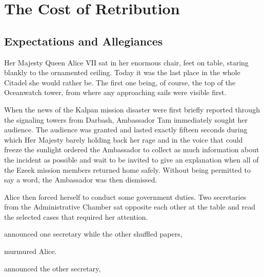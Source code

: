 \chapter{The Cost of Retribution}

\section{Expectations and Allegiances}

Her Majesty Queen Alice VII sat in her enormous chair, feet on table, staring blankly to the ornamented ceiling. Today it was the last place in the whole Citadel she would rather be. The first one being, of course, the top of the Oceanwatch tower, from where any approaching sails were visible first.

When the news of the Kalpan mission disaster were first briefly reported through the signaling towers from Darbash, Ambassador Tam immediately sought her audience. The audience was granted and lasted exactly fifteen seconds during which Her Majesty barely holding back her rage and in the voice that could freeze the sunlight ordered the Ambassador to collect as much information about the incident as possible and wait to be invited to give an explanation when all of the Ezeek mission members returned home safely. Without being permitted to say a word, the Ambassador was then dismissed.

Alice then forced herself to conduct some government duties. Two secretaries from the Administrative Chamber sat opposite each other at the table and read the selected cases that required her attention.

 announced one secretary while the other shuffled papers, 

 murmured Alice.

 announced the other secretary, 


